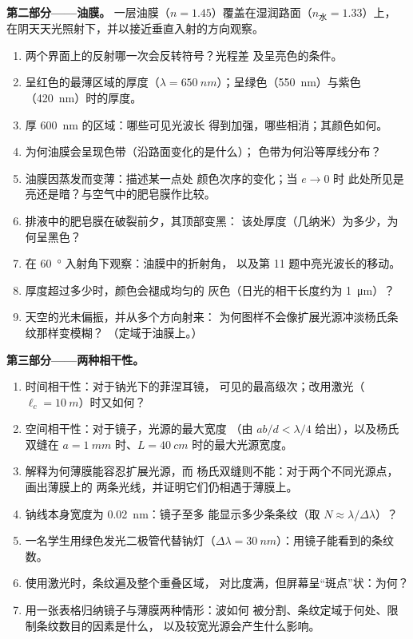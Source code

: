 \begin{problem}
\medskip
\noindent\textbf{第二部分——油膜。}
一层油膜（$n = 1.45$）覆盖在湿润路面（$n_{\text{水}} = 1.33$）上，
在阴天天光照射下，并以接近垂直入射的方向观察。
\begin{enumerate}[resume]
  \item 两个界面上的反射哪一次会反转符号？光程差
        及呈亮色的条件。
  \item 呈红色的最薄区域的厚度（$\lambda =
        \qty{650}{nm}$）；呈绿色（\qty{550}{nm}）与紫色（\qty{420}{nm}）时的厚度。
  \item 厚 \qty{600}{nm} 的区域：哪些可见光波长
        得到加强，哪些相消；其颜色如何。
  \item 为何油膜会呈现色带（沿路面变化的是什么）；
        色带为何沿等厚线分布？
  \item 油膜因蒸发而变薄：描述某一点处
        颜色次序的变化；当 $e \to 0$ 时
        此处所见是亮还是暗？与空气中的肥皂膜作比较。
  \item 排液中的肥皂膜在破裂前夕，其顶部变黑：
        该处厚度（几纳米）为多少，为何呈黑色？
  \item 在 \qty{60}{\degree} 入射角下观察：油膜中的折射角，
        以及第 11 题中亮光波长的移动。
  \item 厚度超过多少时，颜色会褪成均匀的
        灰色（日光的相干长度约为 \qty{1}{\micro m}）？
  \item 天空的光未偏振，并从多个方向射来：
        为何图样不会像扩展光源冲淡杨氏条纹那样变模糊？
        （定域于油膜上。）
\end{enumerate}

\medskip
\noindent\textbf{第三部分——两种相干性。}
\begin{enumerate}[resume]
  \item 时间相干性：对于钠光下的菲涅耳镜，
        可见的最高级次；改用激光（$\ell_c = \qty{10}{m}$）时又如何？
  \item 空间相干性：对于镜子，光源的最大宽度
        （由 $ab/d < \lambda/4$ 给出），以及杨氏双缝在 $a = \qty{1}{mm}$
        时、$L = \qty{40}{cm}$ 时的最大光源宽度。
  \item 解释为何薄膜能容忍扩展光源，而
        杨氏双缝则不能：对于两个不同光源点，画出薄膜上的
        两条光线，并证明它们仍相遇于薄膜上。
  \item 钠线本身宽度为 \qty{0.02}{nm}：镜子至多
        能显示多少条条纹（取 $N \approx \lambda/\Delta\lambda$）？
  \item 一名学生用绿色发光二极管代替钠灯（$\Delta\lambda =
        \qty{30}{nm}$）：用镜子能看到的条纹数。
  \item 使用激光时，条纹遍及整个重叠区域，
        对比度满，但屏幕呈“斑点”状：为何？
  \item 用一张表格归纳镜子与薄膜两种情形：波如何
        被分割、条纹定域于何处、限制条纹数目的因素是什么，
        以及较宽光源会产生什么影响。
\end{enumerate}
\end{problem}
